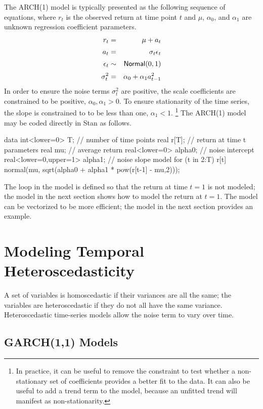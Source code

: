 The ARCH(1) model is typically presented as the following sequence of
equations, where $r_t$ is the observed return at time point $t$
and $\mu$, $\alpha_0$, and $\alpha_1$ are unknown regression coefficient parameters.
%
\begin{eqnarray*}
r_t & = & \mu + a_t
\\[2pt]
a_t & = & \sigma_t \epsilon_t
\\[2pt]
\epsilon_t & \sim & \mbox{\sf Normal}(0,1)
\\[2pt]
\sigma^2_t & = & \alpha_0 + \alpha_1 a_{t-1}^2
\end{eqnarray*}
%
In order to ensure the noise terms $\sigma^2_t$ are positive, the
scale coefficients are constrained to be positive, $\alpha_0, \alpha_1
> 0$.  To ensure stationarity of the time series, the slope is
constrained to to be less than one, $\alpha_1 < 1$.%
%
\footnote{In practice, it can be useful to remove the constraint to
  test whether a non-stationary set of coefficients provides a better
  fit to the data.  It can also be useful to add a trend term to the
  model, because an unfitted trend will manifest as non-stationarity.}
%
The ARCH(1) model may be coded directly in Stan as follows.
%
\begin{stancode}
data {
  int<lower=0> T;   // number of time points
  real r[T];        // return at time t
}
parameters {
  real mu;                       // average return
  real<lower=0> alpha0;          // noise intercept
  real<lower=0,upper=1> alpha1;  // noise slope
}
model {
  for (t in 2:T)
    r[t] ~ normal(mu, sqrt(alpha0 + alpha1 * pow(r[t-1] - mu,2)));
}
\end{stancode}
%
The loop in the model is defined so that the return at time $t=1$ is
not modeled; the model in the next section shows how to model the
return at $t=1$.  The model can be vectorized to be more efficient;
the model in the next section provides an example.

\section{Modeling Temporal Heteroscedasticity}

A set of variables is homoscedastic if their variances are all the
same; the variables are heteroscedastic if they do not all have the
same variance.  Heteroscedastic time-series models allow the noise
term to vary over time.

\subsection{GARCH(1,1) Models}

